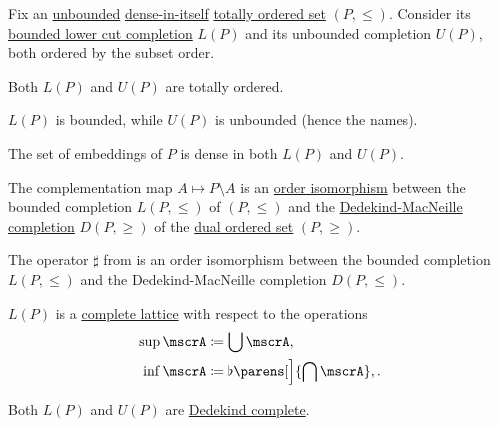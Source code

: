 \begin{theorem}\label{thm:unbounded_lower_cut_completion}
  Fix an \hyperref[def:extremal_points/bounds]{unbounded} \hyperref[def:dense_total_order]{dense-in-itself} \hyperref[def:totally_ordered_set]{totally ordered set} \( (P, \leq) \). Consider its \hyperref[def:lower_cut_completion]{bounded lower cut completion} \( L(P) \) and its unbounded completion \( U(P) \), both ordered by the subset order.

  \begin{thmenum}
     Both \( L(P) \) and \( U(P) \) are totally ordered.

     \( L(P) \) is bounded, while \( U(P) \) is unbounded (hence the names).

     The set of embeddings of \( P \) is dense in both \( L(P) \) and \( U(P) \).

     The complementation map \( A \mapsto P \setminus A \) is an \hyperref[def:preordered_set/homomorphism]{order isomorphism} between the bounded completion \( L(P, \leq) \) of \( (P, \leq) \) and the \hyperref[def:dedekind_macnielle_completion]{Dedekind-MacNeille completion} \( D(P, \geq) \) of the \hyperref[def:preordered_set/dual]{dual ordered set} \( (P, \geq) \).

     The operator \( \sharp \) from  is an order isomorphism between the bounded completion \( L(P, \leq) \) and the Dedekind-MacNeille completion \( D(P, \leq) \).

     \( L(P) \) is a \hyperref[def:complete_lattice]{complete lattice} with respect to the operations
    \begin{align}
      \sup \mscrA &\coloneqq \bigcup \mscrA,                       \label{eq:thm:unbounded_lower_cut_completion/lattice/join} \\
      \inf \mscrA &\coloneqq \flat\parens[\Big]{ \bigcap \mscrA }, \label{eq:thm:unbounded_lower_cut_completion/lattice/meet}.
    \end{align}

     Both \( L(P) \) and \( U(P) \) are \hyperref[def:dedekind_completeness]{Dedekind complete}.
  \end{thmenum}
\end{theorem}
